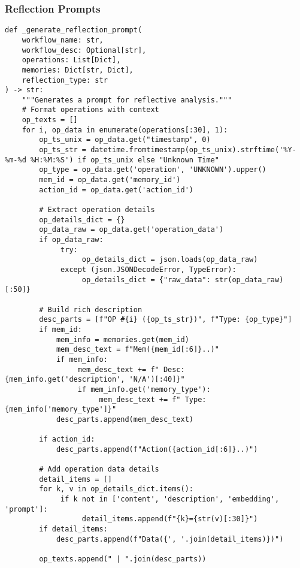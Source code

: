 \documentclass[12pt,a4paper]{article}
\begin{document}
\subsubsection*{Reflection Prompts}
\begin{pageablecode}
\begin{verbatim}
def _generate_reflection_prompt(
    workflow_name: str,
    workflow_desc: Optional[str],
    operations: List[Dict],
    memories: Dict[str, Dict],
    reflection_type: str
) -> str:
    """Generates a prompt for reflective analysis."""
    # Format operations with context
    op_texts = []
    for i, op_data in enumerate(operations[:30], 1):
        op_ts_unix = op_data.get("timestamp", 0)
        op_ts_str = datetime.fromtimestamp(op_ts_unix).strftime('%Y-%m-%d %H:%M:%S') if op_ts_unix else "Unknown Time"
        op_type = op_data.get('operation', 'UNKNOWN').upper()
        mem_id = op_data.get('memory_id')
        action_id = op_data.get('action_id')

        # Extract operation details
        op_details_dict = {}
        op_data_raw = op_data.get('operation_data')
        if op_data_raw:
             try:
                  op_details_dict = json.loads(op_data_raw)
             except (json.JSONDecodeError, TypeError):
                  op_details_dict = {"raw_data": str(op_data_raw)[:50]}

        # Build rich description
        desc_parts = [f"OP #{i} ({op_ts_str})", f"Type: {op_type}"]
        if mem_id:
            mem_info = memories.get(mem_id)
            mem_desc_text = f"Mem({mem_id[:6]}..)"
            if mem_info:
                 mem_desc_text += f" Desc: {mem_info.get('description', 'N/A')[:40]}"
                 if mem_info.get('memory_type'):
                      mem_desc_text += f" Type: {mem_info['memory_type']}"
            desc_parts.append(mem_desc_text)

        if action_id:
            desc_parts.append(f"Action({action_id[:6]}..)")

        # Add operation data details
        detail_items = []
        for k, v in op_details_dict.items():
             if k not in ['content', 'description', 'embedding', 'prompt']:
                  detail_items.append(f"{k}={str(v)[:30]}")
        if detail_items:
            desc_parts.append(f"Data({', '.join(detail_items)})")

        op_texts.append(" | ".join(desc_parts))


\end{verbatim}
\end{pageablecode}
\end{document}
